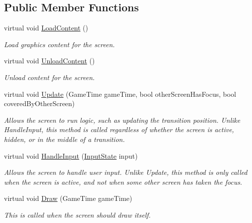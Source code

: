 \subsection*{Public Member Functions}
\begin{DoxyCompactItemize}
\item 
virtual void \hyperlink{classCityMania_1_1GameScreen_a4dc3798784fff49b20280903d796c94c}{LoadContent} ()
\begin{DoxyCompactList}\small\item\em Load graphics content for the screen. \item\end{DoxyCompactList}\item 
virtual void \hyperlink{classCityMania_1_1GameScreen_a038a86bacf5b7d62141477980312f49b}{UnloadContent} ()
\begin{DoxyCompactList}\small\item\em Unload content for the screen. \item\end{DoxyCompactList}\item 
virtual void \hyperlink{classCityMania_1_1GameScreen_a7f0d5b33eca521dc7fcd89eec337ccf9}{Update} (GameTime gameTime, bool otherScreenHasFocus, bool coveredByOtherScreen)
\begin{DoxyCompactList}\small\item\em Allows the screen to run logic, such as updating the transition position. Unlike HandleInput, this method is called regardless of whether the screen is active, hidden, or in the middle of a transition. \item\end{DoxyCompactList}\item 
virtual void \hyperlink{classCityMania_1_1GameScreen_a80edab75e121f4e08b007f47206cf29c}{HandleInput} (\hyperlink{classCityMania_1_1InputState}{InputState} input)
\begin{DoxyCompactList}\small\item\em Allows the screen to handle user input. Unlike Update, this method is only called when the screen is active, and not when some other screen has taken the focus. \item\end{DoxyCompactList}\item 
virtual void \hyperlink{classCityMania_1_1GameScreen_a28fbcdba21da5e606d32d87b18bcdf29}{Draw} (GameTime gameTime)
\begin{DoxyCompactList}\small\item\em This is called when the screen should draw itself. \item\end{DoxyCompactList}\item 

\end{DoxyCompactItemize}
